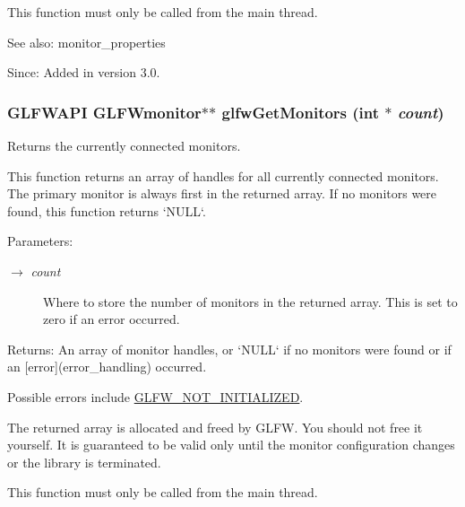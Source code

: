 This function must only be called from the main thread.

\begin{Desc}
\item[See also:]monitor\_\-properties\end{Desc}
\begin{Desc}
\item[Since:]Added in version 3.0. \end{Desc}
\hypertarget{group__monitor_gb4d483284c57e28837bc2cd9639e9665}{
\subsubsection[glfwGetMonitors]{\setlength{\rightskip}{0pt plus 5cm}GLFWAPI {\bf GLFWmonitor}$\ast$$\ast$ glfwGetMonitors (int $\ast$ {\em count})}}
\label{group__monitor_gb4d483284c57e28837bc2cd9639e9665}


Returns the currently connected monitors. 

This function returns an array of handles for all currently connected monitors. The primary monitor is always first in the returned array. If no monitors were found, this function returns `NULL`.

\begin{Desc}
\item[Parameters:]
\begin{description}
\item[\mbox{$\rightarrow$} {\em count}]Where to store the number of monitors in the returned array. This is set to zero if an error occurred. \end{description}
\end{Desc}
\begin{Desc}
\item[Returns:]An array of monitor handles, or `NULL` if no monitors were found or if an \mbox{[}error\mbox{]}(error\_\-handling) occurred.\end{Desc}
Possible errors include \hyperlink{group__errors_g2374ee02c177f12e1fa76ff3ed15e14a}{GLFW\_\-NOT\_\-INITIALIZED}.

The returned array is allocated and freed by GLFW. You should not free it yourself. It is guaranteed to be valid only until the monitor configuration changes or the library is terminated.

This function must only be called from the main thread.

